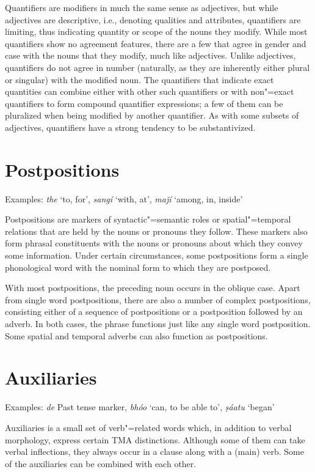 Quantifiers are modifiers in much the same sense as adjectives, but while adjectives are descriptive, i.e., denoting qualities and attributes, quantifiers are limiting, thus indicating quantity or scope of the nouns they modify. While most quantifiers show no agreement features, there are a few that agree in gender and case with the nouns that they modify, much like adjectives. Unlike adjectives, quantifiers do not agree in number (naturally, as they are inherently either plural or singular) with the modified noun. The quantifiers that indicate exact quantities can combine either with other such quantifiers or with non"=exact quantifiers to form compound quantifier expressions; a few of them can be pluralized when being modified by another quantifier. As with some subsets of adjectives, quantifiers have a strong tendency to be substantivized.


\section{Postpositions}
\label{sec:3b-9}
Examples: \textit{the} `to, for', \textit{sangí} `with, at', \textit{maǰí} `among, in, inside'


Postpositions are markers of syntactic"=semantic roles or spatial"=temporal relations that are held by the nouns or pronouns they follow. These markers also form phrasal constituents with the nouns or pronouns about which they convey some information. Under certain circumstances, some postpositions form a single phonological word with the nominal form to which they are postposed.  


With most postpositions, the preceding noun occurs in the oblique case. Apart from single word postpositions, there are also a number of complex postpositions, consisting either of a sequence of postpositions or a postposition followed by an adverb. In both cases, the phrase functions just like any single word postposition. Some spatial and temporal adverbs can also function as postpositions.


\section{Auxiliaries}
\label{sec:3b-10}
Examples: \textit{de} Past tense marker, \textit{bhóo} `can, to be able to', \textit{ṣáatu} `began'


Auxiliaries is a small set of verb"=related words which, in addition to verbal morphology, express certain TMA distinctions. Although some of them can take verbal inflections, they always occur in a clause along with a (main) verb. Some of the auxiliaries can be combined with each other.


